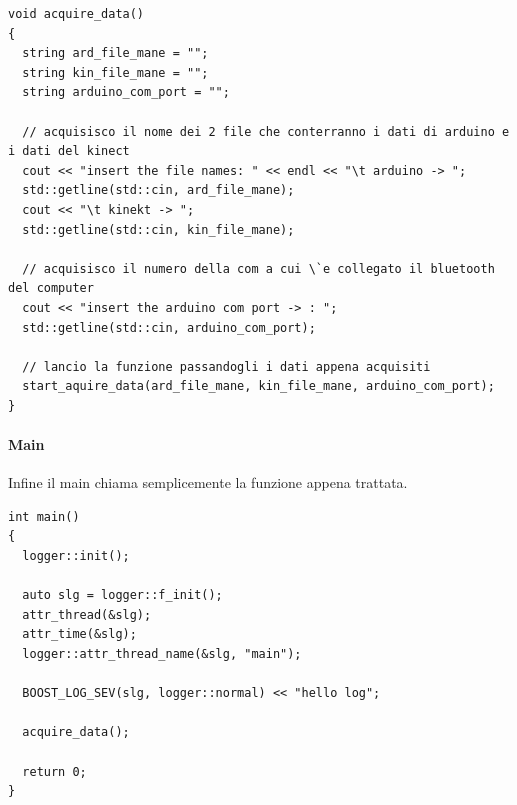\documentclass[10pt,a4paper]{article}
\begin{document}
\begin{lstlisting}[style=mycpp, caption=funzione acquire\_data, captionpos=b]
void acquire_data()
{
  string ard_file_mane = "";
  string kin_file_mane = "";
  string arduino_com_port = "";

  // acquisisco il nome dei 2 file che conterranno i dati di arduino e i dati del kinect
  cout << "insert the file names: " << endl << "\t arduino -> ";
  std::getline(std::cin, ard_file_mane);
  cout << "\t kinekt -> ";
  std::getline(std::cin, kin_file_mane);

  // acquisisco il numero della com a cui \`e collegato il bluetooth del computer 
  cout << "insert the arduino com port -> : ";
  std::getline(std::cin, arduino_com_port);

  // lancio la funzione passandogli i dati appena acquisiti
  start_aquire_data(ard_file_mane, kin_file_mane, arduino_com_port);
}
\end{lstlisting}
%
%
\paragraph{Main}
Infine il main chiama semplicemente la funzione appena trattata.
\begin{lstlisting}[style=mycpp, caption=main del programma, captionpos=b]
int main()
{
  logger::init();

  auto slg = logger::f_init();
  attr_thread(&slg);
  attr_time(&slg);
  logger::attr_thread_name(&slg, "main");

  BOOST_LOG_SEV(slg, logger::normal) << "hello log";

  acquire_data();

  return 0;
}
\end{lstlisting}
\end{document}
